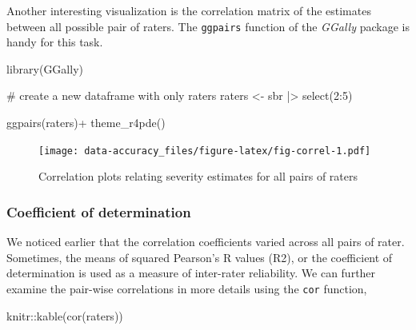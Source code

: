 \documentclass[
  letterpaper,
]{book}
\newenvironment{Shaded}{\begin{snugshade}}{\end{snugshade}}
\newcommand{\CommentTok}[1]{\textcolor[rgb]{0.37,0.37,0.37}{#1}}
\newcommand{\DecValTok}[1]{\textcolor[rgb]{0.68,0.00,0.00}{#1}}
\newcommand{\FunctionTok}[1]{\textcolor[rgb]{0.28,0.35,0.67}{#1}}
\newcommand{\NormalTok}[1]{\textcolor[rgb]{0.00,0.23,0.31}{#1}}
\newcommand{\OtherTok}[1]{\textcolor[rgb]{0.00,0.23,0.31}{#1}}
\newcommand{\SpecialCharTok}[1]{\textcolor[rgb]{0.37,0.37,0.37}{#1}}
\begin{document}
Another interesting visualization is the correlation matrix of the
estimates between all possible pair of raters. The \texttt{ggpairs}
function of the \emph{GGally} package is handy for this task.

\begin{Shaded}
\begin{Highlighting}[]
\FunctionTok{library}\NormalTok{(GGally)}


\CommentTok{\# create a new dataframe with only raters}
\NormalTok{raters }\OtherTok{\textless{}{-}}\NormalTok{ sbr }\SpecialCharTok{|\textgreater{}} 
  \FunctionTok{select}\NormalTok{(}\DecValTok{2}\SpecialCharTok{:}\DecValTok{5}\NormalTok{)}

\FunctionTok{ggpairs}\NormalTok{(raters)}\SpecialCharTok{+}
  \FunctionTok{theme\_r4pde}\NormalTok{()}
\end{Highlighting}
\end{Shaded}

\begin{figure}

\texttt{[image: data-accuracy\_files/figure-latex/fig-correl-1.pdf]} \hfill{}

\caption{\label{fig-correl}Correlation plots relating severity estimates
for all pairs of raters}

\end{figure}

\hypertarget{coefficient-of-determination}{%
\subsubsection{Coefficient of
determination}\label{coefficient-of-determination}}

We noticed earlier that the correlation coefficients varied across all
pairs of rater. Sometimes, the means of squared Pearson's R values (R2),
or the coefficient of determination is used as a measure of inter-rater
reliability. We can further examine the pair-wise correlations in more
details using the \texttt{cor} function,

\begin{Shaded}
\begin{Highlighting}[]
\NormalTok{knitr}\SpecialCharTok{::}\FunctionTok{kable}\NormalTok{(}\FunctionTok{cor}\NormalTok{(raters))}
\end{Highlighting}
\end{Shaded}
\end{document}
